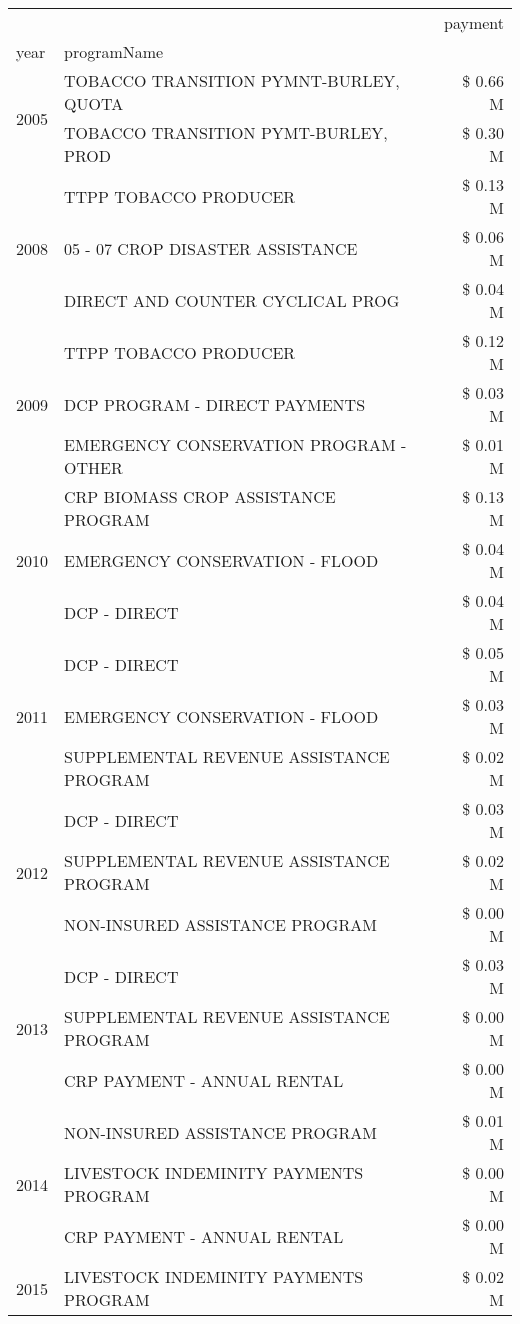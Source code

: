 \begin{tabular}{llr}
\toprule
 &  & payment \\
year & programName &  \\
\midrule
\multirow[t]{2}{*}{2005} & TOBACCO TRANSITION PYMNT-BURLEY, QUOTA & \$ 0.66 M \\
 & TOBACCO TRANSITION PYMT-BURLEY, PROD & \$ 0.30 M \\
\cline{1-3}
\multirow[t]{3}{*}{2008} & TTPP TOBACCO PRODUCER & \$ 0.13 M \\
 & 05 - 07 CROP DISASTER ASSISTANCE & \$ 0.06 M \\
 & DIRECT AND COUNTER CYCLICAL PROG & \$ 0.04 M \\
\cline{1-3}
\multirow[t]{3}{*}{2009} & TTPP TOBACCO PRODUCER & \$ 0.12 M \\
 & DCP PROGRAM - DIRECT PAYMENTS & \$ 0.03 M \\
 & EMERGENCY CONSERVATION PROGRAM - OTHER & \$ 0.01 M \\
\cline{1-3}
\multirow[t]{3}{*}{2010} & CRP BIOMASS CROP ASSISTANCE PROGRAM & \$ 0.13 M \\
 & EMERGENCY CONSERVATION - FLOOD & \$ 0.04 M \\
 & DCP - DIRECT & \$ 0.04 M \\
\cline{1-3}
\multirow[t]{3}{*}{2011} & DCP - DIRECT & \$ 0.05 M \\
 & EMERGENCY CONSERVATION - FLOOD & \$ 0.03 M \\
 & SUPPLEMENTAL REVENUE ASSISTANCE PROGRAM & \$ 0.02 M \\
\cline{1-3}
\multirow[t]{3}{*}{2012} & DCP - DIRECT & \$ 0.03 M \\
 & SUPPLEMENTAL REVENUE ASSISTANCE PROGRAM & \$ 0.02 M \\
 & NON-INSURED ASSISTANCE PROGRAM & \$ 0.00 M \\
\cline{1-3}
\multirow[t]{3}{*}{2013} & DCP - DIRECT & \$ 0.03 M \\
 & SUPPLEMENTAL REVENUE ASSISTANCE PROGRAM & \$ 0.00 M \\
 & CRP PAYMENT - ANNUAL RENTAL & \$ 0.00 M \\
\cline{1-3}
\multirow[t]{3}{*}{2014} & NON-INSURED ASSISTANCE PROGRAM & \$ 0.01 M \\
 & LIVESTOCK INDEMINITY PAYMENTS PROGRAM & \$ 0.00 M \\
 & CRP PAYMENT - ANNUAL RENTAL & \$ 0.00 M \\
\cline{1-3}
\multirow[t]{3}{*}{2015} & LIVESTOCK INDEMINITY PAYMENTS PROGRAM & \$ 0.02 M \\

\end{tabular}
